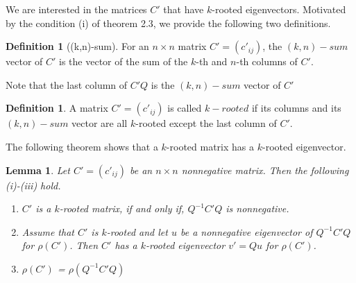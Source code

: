 \documentclass[12pt]{report}
\theoremstyle{plain}
\newtheorem{lem}[thm]{Lemma}
\theoremstyle{definition}
\newtheorem{defn}[thm]{Definition}
\begin{document}
We are interested in the matrices $C'$ that have $k$-rooted eigenvectors.
Motivated by the condition (i) of theorem 2.3, we provide the following two definitions. 

\begin{defn}[(k,n)-sum]
For an $n \times n$ matrix $C'=(c'_{ij})$, the $(k, n)-sum$ vector of $C'$ is the vector of the sum of the $k$-th and  $n$-th columns of $C'$.
\end{defn}

Note that the last column of $C'Q$ is the $(k, n)-sum$ vector of $C'$

\begin{defn}\label{m_rooted}
A  matrix $C'=(c'_{ij})$ is called $k-rooted$  if its  columns and its $(k, n)-sum$ vector are all $k$-rooted except the last column of $C'$.
\end{defn}

The following theorem shows that a $k$-rooted matrix has a $k$-rooted eigenvector. 

\begin{lem} \label{lma_m_rooted}
Let $C'=(c'_{ij})$ be an $n\times n$ nonnegative matrix. Then the following (i)-(iii) hold.
    \begin{enumerate}[label=(\Roman*)]
        \item $C'$ is a $k$-rooted matrix, if and only if, $Q^{-1}C'Q$ is nonnegative.
        \item Assume that $C'$ is $k$-rooted and let $u$ be a nonnegative eigenvector of $Q^{-1}C'Q$
         for $\rho(C')$. Then  $C'$ has a $k$-rooted eigenvector $v'=Qu$ for $\rho(C')$. 
        \item $\rho(C')$ = $\rho(Q^{-1}C'Q)$
    \end{enumerate}
\end{lem}
\end{document}

